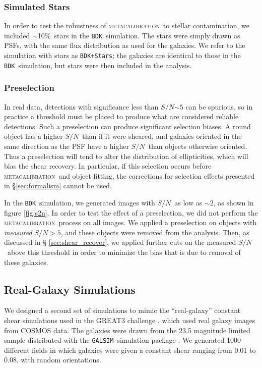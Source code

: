 \documentclass[iop]{emulateapj}
\newcommand{\snr}{$S/N$}
\newcommand{\mcal}{\textsc{metacalibration}}
\newcommand{\nsimNstarperc}{10\%}
\newcommand{\bdksim}{\texttt{BDK}}
\newcommand{\bdstar}{\texttt{BDK+Stars}}
\newcommand{\galsim}{\texttt{GALSIM}}
\begin{document}
\subsubsection{Simulated Stars}

In order to test the robustness of \mcal\ to stellar contamination, we included
$\sim$\nsimNstarperc\ stars in the \bdksim\ simulation.  The stars were simply
drawn as PSFs, with the same flux distribution as used for the galaxies.  We
refer to the simulation with stars as \bdstar; the galaxies are identical to
those in the \bdksim\ simulation, but stars were then included in the analysis.

\subsubsection{Preselection} \label{sec:preselect}

In real data, detections with significance less than \snr$\sim 5$ can be
spurious, so in practice a threshold must be placed to produce what are
considered reliable detections.  Such a preselection can produce significant
selection biases.  A round object has a higher \snr\ than if it were sheared, and
galaxies oriented in the same direction as the PSF have a higher \snr\ than
objects otherwise oriented.  Thus a preselection will tend to alter the
distribution of ellipticities, which will bias the shear recovery.  In
particular, if this selection occurs before \mcal\ and object fitting, the
corrections for selection effects presented in \S \ref{sec:formalism} cannot be
used.

In the \bdksim\ simulation, we generated images with \snr\ as low as $\sim 2$,
as shown in figure \ref{fig:s2n}.  In order to test the effect of a
preselection, we did not perform the \mcal\ process on all images.  We applied
a preselection on objects with {\em measured} \snr$ > 5$, and these objects
were removed from the analysis.  Then, as discussed in \S
\ref{sec:shear_recover}, we applied further cuts on the measured \snr\ above
this threshold in order to minimize the bias that is due to removal of these galaxies.


\subsection{Real-Galaxy Simulations} \label{sec:cosmosim}

We designed a second set of simulations to mimic the ``real-galaxy'' constant
shear simulations used in the GREAT3 challenge \citep{great3}, which used
real galaxy images from COSMOS data.  The galaxies were
drawn from the 23.5 magnitude limited sample distributed
with the \galsim\ simulation package \citep{GALSIM2015}.  We generated 1000
different fields in which galaxies were given a constant shear ranging from
0.01 to 0.08, with random orientations.
\end{document}
